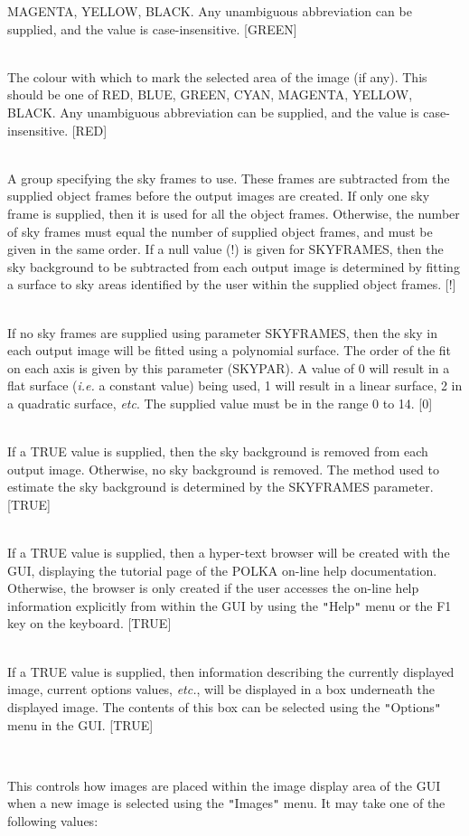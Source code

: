 \documentclass[twoside,11pt]{article}
\renewcommand{\_}{\texttt{\symbol{95}}}
\newcommand{\sstsubsection}[1]{ \item[{#1}] \mbox{} \\}
\newcommand{\sstitemlist}[1]{
  \mbox{} \\
  \vspace{-3.5ex}
  \begin{itemize}
     #1
  \end{itemize}
}
\newcommand{\sstsubsection}[1]{\item[{#1}]}
\newcommand{\sstitemlist}[1]{
      \begin{itemize}
         #1
      \end{itemize}
      \\
   }
\begin{document}
{{{         MAGENTA, YELLOW, BLACK. Any unambiguous abbreviation can be supplied,
         and the value is case-insensitive. [GREEN]
      }
      \sstsubsection{
         SELCOL = LITERAL (Update)
      }{
         The colour with which to mark the selected area of the image (if any).
         This should be one of RED, BLUE, GREEN, CYAN, MAGENTA, YELLOW, BLACK.
         Any unambiguous abbreviation can be supplied, and the value is
         case-insensitive. [RED]
      }
      \sstsubsection{
         SKYFRAMES = NDF (Read)
      }{
         A group specifying the sky frames to use. These frames are subtracted
         from the supplied object frames before the output images are created.
         If only one sky frame is supplied, then it is used for all the object
         frames. Otherwise, the number of sky frames must equal the number of
         supplied object frames, and must be given in the same order. If a
         null value (!) is given for SKYFRAMES, then the sky background to be
         subtracted from each output image is determined by fitting a surface
         to sky areas identified by the user within the supplied object
         frames. [!]
      }
      \sstsubsection{
         SKYPAR = \_INTEGER (Update)
      }{
         If no sky frames are supplied using parameter SKYFRAMES, then
         the sky in each output image will be fitted using a polynomial
         surface. The order of the fit on each axis is given by this
         parameter (SKYPAR). A value of 0 will result in a flat surface
         (\emph{i.e.} a constant value) being used, 1 will result in a linear
         surface, 2 in a quadratic surface, \emph{etc}. The supplied value
         must be in the range 0 to 14. [0]
      }
      \sstsubsection{
         SKYOFF = \_LOGICAL (Update)
      }{
         If a TRUE value is supplied, then the sky background is removed
         from each output image. Otherwise, no sky background is removed.
         The method used to estimate the sky background is determined by
         the SKYFRAMES parameter. [TRUE]
      }
      \sstsubsection{
         STARTHELP = \_LOGICAL (Read)
      }{
         If a TRUE value is supplied, then a hyper-text browser will be
         created with the GUI, displaying the tutorial page of the POLKA
         on-line help documentation. Otherwise, the browser is only created
         if the user accesses the on-line help information explicitly
         from within the GUI by using the {\tt "}Help{\tt "} menu or the F1 key on
         the keyboard. [TRUE]
      }
      \sstsubsection{
         STATUSAREA = \_LOGICAL (Update)
      }{
         If a TRUE value is supplied, then information describing the
         currently displayed image, current options values, \emph{etc.}, will be
         displayed in a box underneath the displayed image. The contents
         of this box can be selected using the {\tt "}Options{\tt "} menu in the GUI.
         [TRUE]
      }
      \sstsubsection{
         VIEW = LITERAL (Update)
      }{
         This controls how images are placed within the image display
         area of the GUI when a new image is selected using the {\tt "}Images{\tt "}
         menu. It may take one of the following values:
         \sstitemlist{

}}}}
\end{document}
